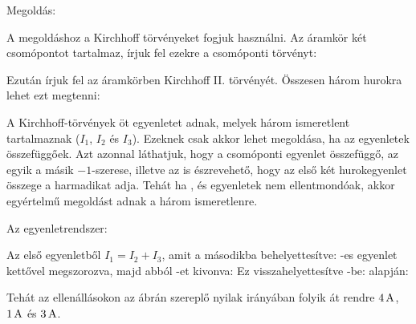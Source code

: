 
\ifdefined\megoldas
 
 Megoldás: 

 A megoldáshoz a Kirchhoff törvényeket fogjuk használni. Az áramkör két csomópontot tartalmaz, írjuk fel ezekre a csomóponti törvényt:

 Ezután írjuk fel az áramkörben Kirchhoff II. törvényét. Összesen három hurokra lehet ezt megtenni:

 A Kirchhoff-törvények öt egyenletet adnak, melyek három ismeretlent tartalmaznak ($I_1$, $I_2$ és $I_3$). Ezeknek csak akkor lehet megoldása, ha az egyenletek összefüggőek. Azt azonnal láthatjuk, hogy a csomóponti egyenlet összefüggő, az egyik a másik $-1$-szerese, illetve az is észrevehető, hogy az első két hurokegyenlet összege a harmadikat adja. Tehát ha ,  és  egyenletek nem ellentmondóak, akkor egyértelmű megoldást adnak a három ismeretlenre.

 Az egyenletrendszer:

 Az első egyenletből $I_1=I_2+I_3$, amit a másodikba behelyettesítve:
 -es egyenlet kettővel megszorozva, majd abból -et kivonva:
 Ez visszahelyettesítve -be:
  alapján:

 Tehát az ellenállásokon az ábrán szereplő nyilak irányában folyik át rendre $4\mathrm{\, A}$, $1\mathrm{\, A}$ és $3\mathrm{\, A}$.

\fi